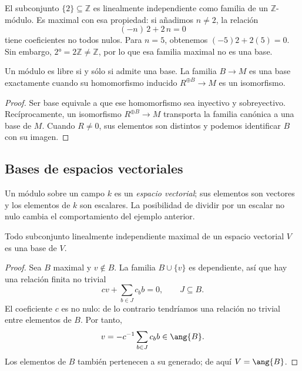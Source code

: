 \begin{ejem}
El subconjunto $\{2\}\subseteq\mathbb Z$ es linealmente independiente como familia de un $\mathbb Z$-módulo. Es maximal con esa propiedad: si añadimos $n\ne2$, la relación
\[
(-n)\,2+2\,n=0
\]
tiene coeficientes no todos nulos. Para $n=5$, obtenemos $(-5)2+2(5)=0$. Sin embargo, $\ang{2}=2\mathbb Z\ne\mathbb Z$, por lo que esa familia maximal no es una base.
\end{ejem}

\begin{lema}\label{lema:C20-libre-base}
Un módulo es libre si y sólo si admite una base. La familia $B\to M$ es una base exactamente cuando su homomorfismo inducido $R^{\oplus B}\to M$ es un isomorfismo.
\end{lema}
\begin{proof}
Ser base equivale a que ese homomorfismo sea inyectivo y sobreyectivo. Recíprocamente, un isomorfismo $R^{\oplus B}\to M$ transporta la familia canónica a una base de $M$. Cuando $R\ne0$, sus elementos son distintos y podemos identificar $B$ con su imagen.
\end{proof}

\subsection{Bases de espacios vectoriales}
Un módulo sobre un campo $k$ es un \emph{espacio vectorial}; sus elementos son vectores y los elementos de $k$ son escalares. La posibilidad de dividir por un escalar no nulo cambia el comportamiento del ejemplo anterior.

\begin{lema}\label{lema:C20-maximal-base}
Todo subconjunto linealmente independiente maximal de un espacio vectorial $V$ es una base de $V$.
\end{lema}
\begin{proof}
Sea $B$ maximal y $v\notin B$. La familia $B\cup\{v\}$ es dependiente, así que hay una relación finita no trivial
\[
cv+\sum_{b\in J}c_bb=0,\qquad J\subseteq B.
\]
El coeficiente $c$ es no nulo: de lo contrario tendríamos una relación no trivial entre elementos de $B$. Por tanto,
\[
v=-c^{-1}\sum_{b\in J}c_bb\in\ang{B}.
\]
Los elementos de $B$ también pertenecen a su generado; de aquí $V=\ang{B}$.
\end{proof}

